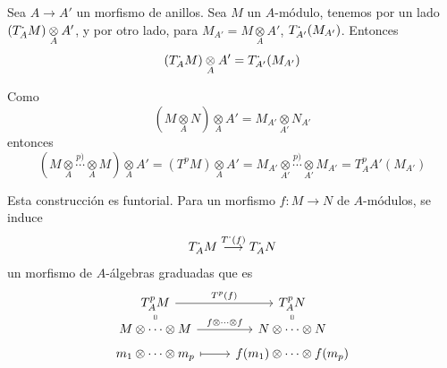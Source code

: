 Sea $A \longrightarrow A'$ un morfismo de anillos. Sea $M$ un $A$-m\'odulo, tenemos por un lado $(T^{\boldsymbol{\cdot}}_AM) \underset{A}{\otimes} A'$, y por otro lado, para  $M_{A'} = M \underset{A}{\otimes} A'$, $T^{\boldsymbol{\cdot}}_{A'} (M_{A'})$. Entonces 
$$(T^{\boldsymbol{\cdot}}_AM) \underset{A}{\otimes} A'= T^{\boldsymbol{\cdot}}_{A'} (M_{A'})$$

Como $$(M\underset{A}{\otimes} N) \underset{A}{\otimes} A' = M_{A'} \underset{A'}{\otimes} N_{A'}$$
entonces
$$(M \underset{A}{\otimes} \overset{p)}{\cdots} \underset{A}{\otimes} M) \underset{A}{\otimes} A' = (T^pM) \underset{A}{\otimes} A' = M_{A
'} \underset{A'}{\otimes}  \overset{p)}{\cdots} \underset{A'}{\otimes} M_{A'} = T^p_A{A'}(M_{A'})$$

Esta construcci\'on es funtorial. Para un morfismo $f: M \longrightarrow N$ de $A$-m\'odulos, se induce 
$$T^{\boldsymbol{\cdot}}_AM \overset{T^{\boldsymbol{\cdot}}(f)}{\longrightarrow}T^{\boldsymbol{\cdot}}_AN$$
un morfismo de $A$-\'algebras graduadas que es 
$$\bt T^p_AM \arrow{r}{T^{p}(f)} \arrow[equal]{d}& T^p_AN\arrow[equal]{d} \\[-5mm] M \otimes \cdots \otimes M \arrow{r}{f\otimes \cdots\otimes f} & N \otimes \cdots \otimes N \\[-5mm] m_1\otimes \cdots \otimes m_p \arrow[mapsto]{r} & f(m_1)\otimes \cdots \otimes f(m_p) \et$$

